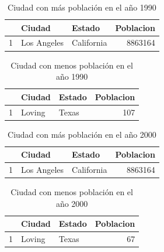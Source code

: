 \documentclass[conference]{IEEEtran}\usepackage[]{graphicx}\usepackage[]{color}
\begin{document}
\begin{table}[ht]
\centering
\begin{tabular}{rllr}
  \hline
 & Ciudad & Estado & Poblacion \\ 
  \hline
1 & Los Angeles & California & 8863164 \\ 
   \hline
\end{tabular}
\caption{Ciudad con más población en el año 1990} 
\end{table}


\begin{table}[ht]
\centering
\begin{tabular}{rllr}
  \hline
 & Ciudad & Estado & Poblacion \\ 
  \hline
1 & Loving & Texas & 107 \\ 
   \hline
\end{tabular}
\caption{Ciudad con menos población en el año 1990} 
\end{table}


\begin{table}[ht]
\centering
\begin{tabular}{rllr}
  \hline
 & Ciudad & Estado & Poblacion \\ 
  \hline
1 & Los Angeles & California & 8863164 \\ 
   \hline
\end{tabular}
\caption{Ciudad con más población en el año 2000} 
\end{table}


\begin{table}[ht]
\centering
\begin{tabular}{rllr}
  \hline
 & Ciudad & Estado & Poblacion \\ 
  \hline
1 & Loving & Texas &  67 \\ 
   \hline
\end{tabular}
\caption{Ciudad con menos población en el año 2000} 
\end{table}
\end{document}
